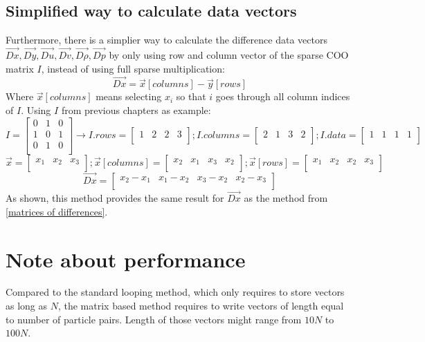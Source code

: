 \documentclass{article}
\begin{document}
\subsection{Simplified way to calculate data vectors}
Furthermore, there is a simplier way to calculate the difference data vectors $\Vec{Dx}, \Vec{Dy}, \Vec{Du}, \Vec{Dv}, \Vec{D\rho}, \Vec{Dp}$ by only using row and column vector of the sparse COO matrix $I$, instead of using full sparse multiplication:
$$\Vec{Dx} = \Vec{x}[columns]-\Vec{y}[rows] $$
Where $\Vec{x}[columns]$ means selecting $x_i$ so that $i$ goes through all column indices of $I$. Using $I$ from previous chapters as example:
$$I = 
\begin{bmatrix}
0 & 1 & 0\\
1 & 0 & 1\\
0 & 1 & 0\\
\end{bmatrix}
\to I.rows = 
\begin{bmatrix}
1 & 2 & 2 & 3\\
\end{bmatrix}
; I.columns = 
\begin{bmatrix}
2 & 1 & 3 & 2\\
\end{bmatrix}
; I.data = 
\begin{bmatrix}
1 & 1 & 1 & 1\\
\end{bmatrix}
$$
$$
\vec{x}=
\begin{bmatrix}
x_1 & x_2 & x_3\\
\end{bmatrix}
; 
\vec{x}[columns]=
\begin{bmatrix}
x_2 & x_1 & x_3 & x_2\\
\end{bmatrix}
; 
\vec{x}[rows]=
\begin{bmatrix}
x_1 & x_2 & x_2 & x_3\\
\end{bmatrix}
$$
$$
\Vec{Dx} = 
\begin{bmatrix}
x_2-x_1 & x_1-x_2 & x_3-x_2 & x_2-x_3\\
\end{bmatrix}
$$
As shown, this method provides the same result for $\Vec{Dx}$ as the method from \ref{matrices of differences}.
\section{Note about performance}
Compared to the standard looping method, which only requires to store vectors as long as $N$, the matrix based method requires to write vectors of length equal to number of particle pairs. Length of those vectors might range from $10N$ to $100N$.
\end{document}
